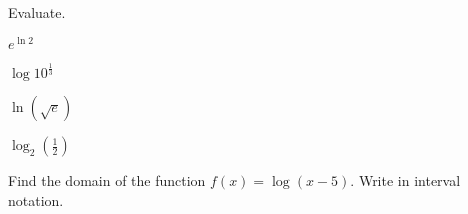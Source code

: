 \newpage

\begin{exercise}
	Evaluate.\\
	\noindent
	\begin{enumerate*}[label={(\arabic*)~}]
		\item \parbox{0.2\textwidth}{$e^{\ln 2}$ }
		\item \parbox{0.2\textwidth}{$\log 10^{\frac13}$ }
		\item \parbox{0.2\textwidth}{ $\ln(\sqrt{e})$ }
		\item \parbox{0.2\textwidth}{$\log_2(\frac12)$ }
		\hfill\null
	\end{enumerate*}
\end{exercise}

\vfill
\begin{center} \hfill
\end{center}


\begin{exercise}Find the domain of the function $f(x)=\log(x-5)$. Write in interval notation.
\end{exercise}
\vfill
\begin{center} \hfill
\end{center}

